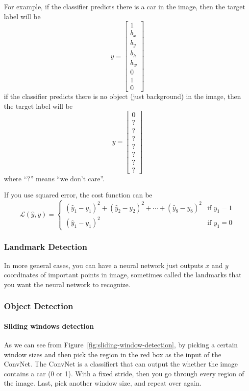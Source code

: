 \documentclass[UTF8]{article}
\newcommand{\Vector}[1]{\boldsymbol{\mathit{#1}}}   %
\newcommand{\Cal}[1]{\mathcal{#1}}                  %
\begin{document}
For example, if the classifier predicts there is a car in the image, then the target label will be
$$ \Vector{y} = \left[\begin{array}{c} 1 \\ b_x \\ b_y \\ b_h \\ b_w \\ 0 \\ 1 \\ 0
\end{array}\right] $$
if the classifier predicts there is no object (just background) in the image, then the target label
will be
$$ \Vector{y} = \left[\begin{array}{c} 0 \\ ? \\ ? \\ ? \\ ? \\ ? \\ ? \\ ? \end{array}\right] $$
where ``$?$'' means ``we don't care''.

If you use squared error, the cost function can be
$$ \Cal{L}(\hat{y}, y) = \left\{\begin{array}{ll} (\hat{y}_1 - y_1)^2 + (\hat{y}_2 - y_2)^2 + \cdots
+ (\hat{y}_8 - y_8)^2 & \text{if } y_1 = 1 \\ (\hat{y}_1 - y_1)^2 & \text{if } y_1 = 0 \end{array}
\right. $$

\subsubsection{Landmark Detection}
In more general cases, you can have a neural network just outputs $x$ and $y$ coordinates of
important points in image, sometimes called the landmarks that you want the neural network to
recognize.

\subsubsection{Object Detection}
\paragraph{Sliding windows detection}
As we can see from Figure~\ref{fig:sliding-window-detection}, by picking a certain window sizes and
then pick the region in the red box as the input of the ConvNet. The ConvNet is a classifiert that
can output the whether the image contains a car (0 or 1). With a fixed stride, then you go
through every region of the image. Last, pick another window size, and repeat over again.
\end{document}
